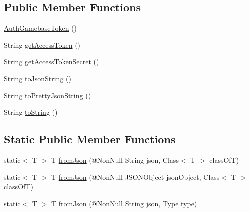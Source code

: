 \subsection*{Public Member Functions}
\begin{DoxyCompactItemize}
\item 
\hyperlink{classcom_1_1toast_1_1android_1_1gamebase_1_1auth_1_1data_1_1_auth_gamebase_token_ae14a7e6142926409a65d1aee211a83b4}{Auth\+Gamebase\+Token} ()
\item 
String \hyperlink{classcom_1_1toast_1_1android_1_1gamebase_1_1auth_1_1data_1_1_auth_gamebase_token_ae5d68509be41985a7f70a8fb907a576a}{get\+Access\+Token} ()
\item 
String \hyperlink{classcom_1_1toast_1_1android_1_1gamebase_1_1auth_1_1data_1_1_auth_gamebase_token_a2f7a6155ef340f2ff7922b6ace1df44a}{get\+Access\+Token\+Secret} ()
\item 
String \hyperlink{classcom_1_1toast_1_1android_1_1gamebase_1_1base_1_1_value_object_a58acf6402880e9769d79d8667581fa6a}{to\+Json\+String} ()
\item 
String \hyperlink{classcom_1_1toast_1_1android_1_1gamebase_1_1base_1_1_value_object_a054431f3d988a22295cfc8b784ff2637}{to\+Pretty\+Json\+String} ()
\item 
String \hyperlink{classcom_1_1toast_1_1android_1_1gamebase_1_1base_1_1_value_object_ad146fa8579a5f8a876c4688cc5a68520}{to\+String} ()
\end{DoxyCompactItemize}
\subsection*{Static Public Member Functions}
\begin{DoxyCompactItemize}
\item 
static$<$ T $>$ T \hyperlink{classcom_1_1toast_1_1android_1_1gamebase_1_1base_1_1_value_object_ae6655c88c20a9a8406dc11b46250ac7b}{from\+Json} (@Non\+Null String json, Class$<$ T $>$ class\+OfT)
\item 
static$<$ T $>$ T \hyperlink{classcom_1_1toast_1_1android_1_1gamebase_1_1base_1_1_value_object_ab83c4196ee2e3f11553bbe0f04dc2101}{from\+Json} (@Non\+Null J\+S\+O\+N\+Object json\+Object, Class$<$ T $>$ class\+OfT)
\item 
static$<$ T $>$ T \hyperlink{classcom_1_1toast_1_1android_1_1gamebase_1_1base_1_1_value_object_aa901d97d495150b54bcb80c05672f58a}{from\+Json} (@Non\+Null String json, Type type)
\end{DoxyCompactItemize}


